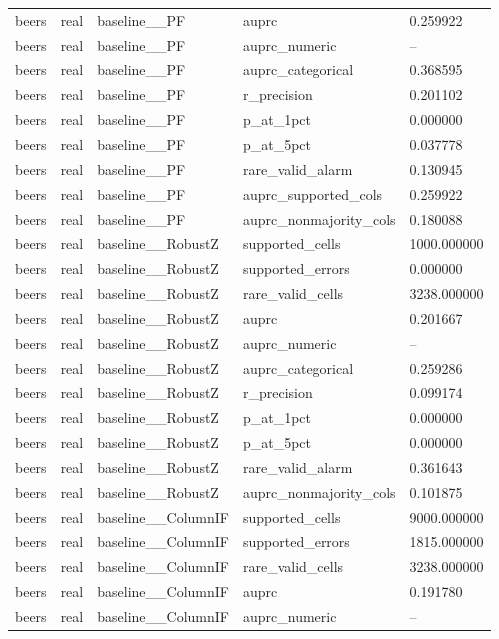 \begin{tabular}{lllll}
beers & real & baseline\_\_PF & auprc & 0.259922 \\
beers & real & baseline\_\_PF & auprc\_numeric & -- \\
beers & real & baseline\_\_PF & auprc\_categorical & 0.368595 \\
beers & real & baseline\_\_PF & r\_precision & 0.201102 \\
beers & real & baseline\_\_PF & p\_at\_1pct & 0.000000 \\
beers & real & baseline\_\_PF & p\_at\_5pct & 0.037778 \\
beers & real & baseline\_\_PF & rare\_valid\_alarm & 0.130945 \\
beers & real & baseline\_\_PF & auprc\_supported\_cols & 0.259922 \\
beers & real & baseline\_\_PF & auprc\_nonmajority\_cols & 0.180088 \\
beers & real & baseline\_\_RobustZ & supported\_cells & 1000.000000 \\
beers & real & baseline\_\_RobustZ & supported\_errors & 0.000000 \\
beers & real & baseline\_\_RobustZ & rare\_valid\_cells & 3238.000000 \\
beers & real & baseline\_\_RobustZ & auprc & 0.201667 \\
beers & real & baseline\_\_RobustZ & auprc\_numeric & -- \\
beers & real & baseline\_\_RobustZ & auprc\_categorical & 0.259286 \\
beers & real & baseline\_\_RobustZ & r\_precision & 0.099174 \\
beers & real & baseline\_\_RobustZ & p\_at\_1pct & 0.000000 \\
beers & real & baseline\_\_RobustZ & p\_at\_5pct & 0.000000 \\
beers & real & baseline\_\_RobustZ & rare\_valid\_alarm & 0.361643 \\
beers & real & baseline\_\_RobustZ & auprc\_nonmajority\_cols & 0.101875 \\
beers & real & baseline\_\_ColumnIF & supported\_cells & 9000.000000 \\
beers & real & baseline\_\_ColumnIF & supported\_errors & 1815.000000 \\
beers & real & baseline\_\_ColumnIF & rare\_valid\_cells & 3238.000000 \\
beers & real & baseline\_\_ColumnIF & auprc & 0.191780 \\
beers & real & baseline\_\_ColumnIF & auprc\_numeric & -- \\

\end{tabular}
